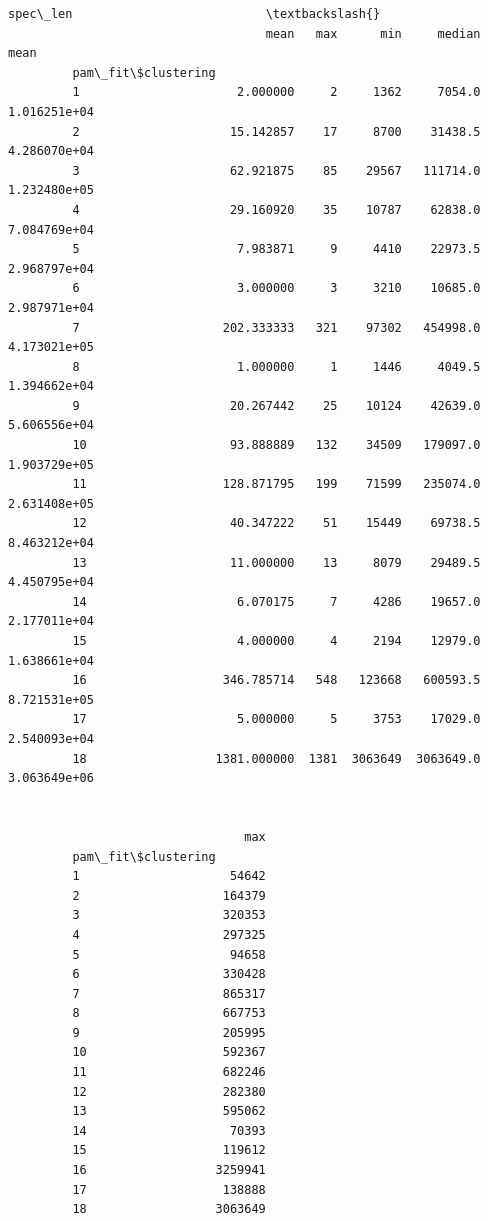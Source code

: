 \documentclass[11pt]{article}
\begin{document}
\begin{Verbatim}[commandchars=\\\{\}]
                                               spec\_len                           \textbackslash{}
                                    mean   max      min     median          mean   
         pam\_fit\$clustering                                                        
         1                      2.000000     2     1362     7054.0  1.016251e+04   
         2                     15.142857    17     8700    31438.5  4.286070e+04   
         3                     62.921875    85    29567   111714.0  1.232480e+05   
         4                     29.160920    35    10787    62838.0  7.084769e+04   
         5                      7.983871     9     4410    22973.5  2.968797e+04   
         6                      3.000000     3     3210    10685.0  2.987971e+04   
         7                    202.333333   321    97302   454998.0  4.173021e+05   
         8                      1.000000     1     1446     4049.5  1.394662e+04   
         9                     20.267442    25    10124    42639.0  5.606556e+04   
         10                    93.888889   132    34509   179097.0  1.903729e+05   
         11                   128.871795   199    71599   235074.0  2.631408e+05   
         12                    40.347222    51    15449    69738.5  8.463212e+04   
         13                    11.000000    13     8079    29489.5  4.450795e+04   
         14                     6.070175     7     4286    19657.0  2.177011e+04   
         15                     4.000000     4     2194    12979.0  1.638661e+04   
         16                   346.785714   548   123668   600593.5  8.721531e+05   
         17                     5.000000     5     3753    17029.0  2.540093e+04   
         18                  1381.000000  1381  3063649  3063649.0  3.063649e+06   
         
                                      
                                 max  
         pam\_fit\$clustering           
         1                     54642  
         2                    164379  
         3                    320353  
         4                    297325  
         5                     94658  
         6                    330428  
         7                    865317  
         8                    667753  
         9                    205995  
         10                   592367  
         11                   682246  
         12                   282380  
         13                   595062  
         14                    70393  
         15                   119612  
         16                  3259941  
         17                   138888  
         18                  3063649  
\end{Verbatim}
            
\end{document}

